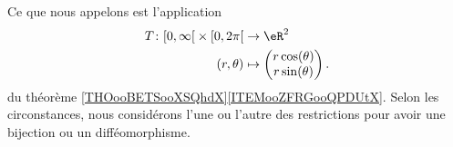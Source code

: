 \begin{definition}
    Ce que nous appelons  est l'application 
    \begin{equation}
        \begin{aligned}
            T\colon \mathopen[ 0 , \infty \mathclose[\times \mathopen[ 0 , 2\pi \mathclose[&\to \eR^2 \\
                (r,\theta)&\mapsto \begin{pmatrix}
                    r\cos(\theta)    \\ 
                    r\sin(\theta)    
                \end{pmatrix}.
        \end{aligned}
    \end{equation} 
    du théorème \ref{THOooBETSooXSQhdX}\ref{ITEMooZFRGooQPDUtX}. Selon les circonstances, nous considérons l'une ou l'autre des restrictions pour avoir une bijection ou un difféomorphisme.
\end{definition}

